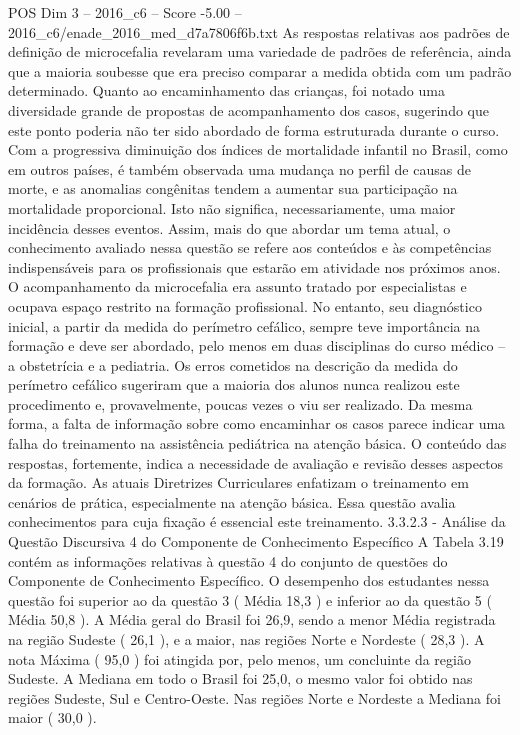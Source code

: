 \begin{textsample}{POS Dim 3 – 2016\_c6 – Score -5.00 – 2016\_c6/enade\_2016\_med\_d7a7806f6b.txt}
As respostas relativas aos padrões de definição de microcefalia revelaram uma variedade de padrões de referência, ainda que a maioria soubesse que era preciso comparar a medida obtida com um padrão determinado.
Quanto ao encaminhamento das crianças, foi notado uma diversidade grande de propostas de acompanhamento dos casos, sugerindo que este ponto poderia não ter sido abordado de forma estruturada durante o curso.
Com a progressiva diminuição dos índices de mortalidade infantil no Brasil, como em outros países, é também observada uma mudança no perfil de causas de morte, e as anomalias congênitas tendem a aumentar sua participação na mortalidade proporcional.
Isto não significa, necessariamente, uma maior incidência desses eventos.
Assim, mais do que abordar um tema atual, o conhecimento avaliado nessa questão se refere aos conteúdos e às competências indispensáveis para os profissionais que estarão em atividade nos próximos anos.
O acompanhamento da microcefalia era assunto tratado por especialistas e ocupava espaço restrito na formação profissional.
No entanto, seu diagnóstico inicial, a partir da medida do perímetro cefálico, sempre teve importância na formação e deve ser abordado, pelo menos em duas disciplinas do curso médico – a obstetrícia e a pediatria.
Os erros cometidos na descrição da medida do perímetro cefálico sugeriram que a maioria dos alunos nunca realizou este procedimento e, provavelmente, poucas vezes o viu ser realizado.
Da mesma forma, a falta de informação sobre como encaminhar os casos parece indicar uma falha do treinamento na assistência pediátrica na atenção básica.
O conteúdo das respostas, fortemente, indica a necessidade de avaliação e revisão desses aspectos da formação.
As atuais Diretrizes Curriculares enfatizam o treinamento em cenários de prática, especialmente na atenção básica.
Essa questão avalia conhecimentos para cuja fixação é essencial este treinamento. 3.3.2.3 - Análise da Questão Discursiva 4 do Componente de Conhecimento Específico A Tabela 3.19 contém as informações relativas à questão 4 do conjunto de questões do Componente de Conhecimento Específico.
O desempenho dos estudantes nessa questão foi superior ao da questão 3 ( Média 18,3 ) e inferior ao da questão 5 ( Média 50,8 ).
A Média geral do Brasil foi 26,9, sendo a menor Média registrada na região Sudeste ( 26,1 ), e a maior, nas regiões Norte e Nordeste ( 28,3 ).
A nota Máxima ( 95,0 ) foi atingida por, pelo menos, um concluinte da região Sudeste.
A Mediana em todo o Brasil foi 25,0, o mesmo valor foi obtido nas regiões Sudeste, Sul e Centro-Oeste.
Nas regiões Norte e Nordeste a Mediana foi maior ( 30,0 ).

\end{textsample}
